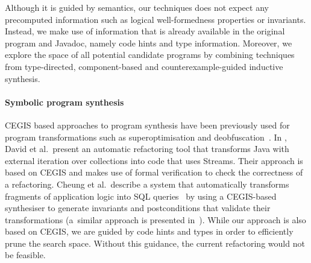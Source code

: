 \documentclass[sigconf,review,anonymous]{acmart}
\begin{document}
%
%
%

Although it is guided by semantics, our techniques does not expect any
precomputed information such as logical well-formedness properties or
invariants. Instead, we make use of information that is already
available in the original program and Javadoc, namely code hints and
type information. Moreover, we explore the space of all potential
candidate programs by combining techniques from type-directed,
component-based and counterexample-guided inductive synthesis.

\paragraph{Symbolic program synthesis}


CEGIS based approaches to program synthesis have been previously used
for program transformations such as superoptimisation and
deobfuscation~\cite{DBLP:conf/icse/JhaGST10}.  In
\cite{DBLP:journals/corr/abs-1712-07388}, David et al.~present an
automatic refactoring tool that transforms Java with external
iteration over collections into code that uses Streams. Their approach
is based on CEGIS and makes use of formal verification to check the
correctness of a refactoring.  Cheung et al.~describe a system that
automatically transforms fragments of application logic into SQL
queries~\cite{DBLP:conf/pldi/CheungSM13} by using a CEGIS-based
synthesiser to generate invariants and postconditions that validate
their transformations (a~similar approach is presented
in~\cite{DBLP:conf/cc/IuCZ10}).  While our approach is also based
on CEGIS, we are guided by code hints and types in
order to efficiently prune the search space. Without this guidance,
the current refactoring would not be feasible.  
\end{document}

